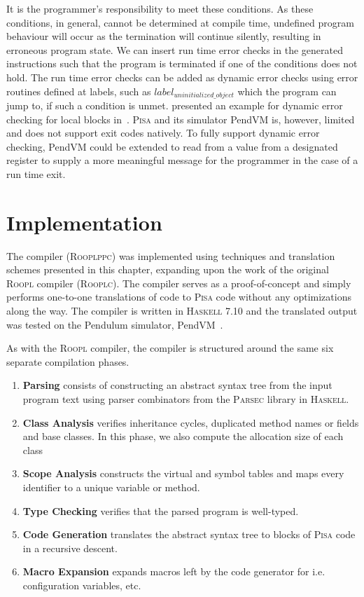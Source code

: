 It is the programmer's responsibility to meet these conditions. As these conditions, in general, cannot be determined at compile time, undefined program behaviour will occur as the termination will continue silently, resulting in erroneous program state. We can insert run time error checks in the generated instructions such that the program is terminated if one of the conditions does not hold. The run time error checks can be added as dynamic error checks using error routines defined at labels, such as $label_{uninitialized\_object}$ which the program can jump to, if such a condition is unmet. \citeauthor{th:roopl} presented an example for dynamic error checking for local blocks in~\cite{th:roopl}. \textsc{Pisa} and its simulator PendVM is, however, limited and does not support exit codes natively. To fully support dynamic error checking, PendVM could be extended to read from a value from a designated register to supply a more meaningful message for the programmer in the case of a run time exit.
 
\section{Implementation}
\label{sec:implementation}
The \rooplpp compiler (\textsc{Rooplppc}) was implemented using techniques and translation schemes presented in this chapter, expanding upon the work of the original \textsc{Roopl} compiler (\textsc{Rooplc}). The compiler serves as a proof-of-concept and simply performs one-to-one translations of \rooplpp code to \textsc{Pisa} code without any optimizations along the way. The compiler is written in \textsc{Haskell} 7.10 and the translated output was tested on the Pendulum simulator, PendVM~\cite{cr:pendvm}. 

As with the \textsc{Roopl} compiler, the \rooplpp compiler is structured around the same six separate compilation phases.
\begin{enumerate}
    \item \textbf{Parsing} consists of constructing an abstract syntax tree from the input program text using parser combinators from the \textsc{Parsec} library in \textsc{Haskell}.
    \item \textbf{Class Analysis} verifies inheritance cycles, duplicated method names or fields and base classes. In this phase, we also compute the allocation size of each class
    \item \textbf{Scope Analysis} constructs the virtual and symbol tables and maps every identifier to a unique variable or method.
    \item \textbf{Type Checking} verifies that the parsed program is well-typed.
    \item \textbf{Code Generation} translates the abstract syntax tree to blocks of \textsc{Pisa} code in a recursive descent.
    \item \textbf{Macro Expansion} expands macros left by the code generator for i.e. configuration variables, etc.
\end{enumerate}

